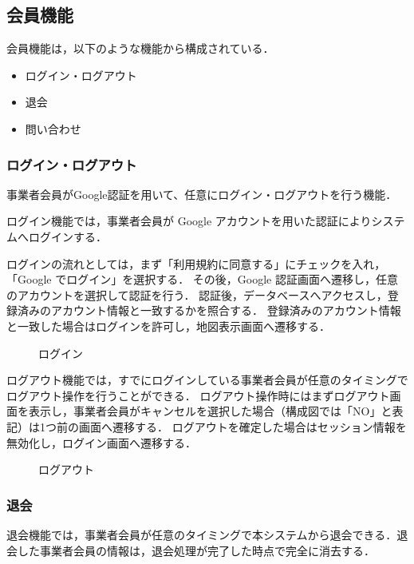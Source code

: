 \subsection{会員機能}
会員機能は，以下のような機能から構成されている．

\begin{itemize}
    \item ログイン・ログアウト
    \item 退会
    \item 問い合わせ
\end{itemize}


\subsubsection{ログイン・ログアウト}
事業者会員がGoogle認証を用いて、任意にログイン・ログアウトを行う機能．

ログイン機能では，事業者会員が Google アカウントを用いた認証によりシステムへログインする．

ログインの流れとしては，まず「利用規約に同意する」にチェックを入れ，「Google でログイン」を選択する．
その後，Google 認証画面へ遷移し，任意のアカウントを選択して認証を行う．
認証後，データベースへアクセスし，登録済みのアカウント情報と一致するかを照合する．
登録済みのアカウント情報と一致した場合はログインを許可し，地図表示画面へ遷移する．

\begin{figure}[H]
    \centering
    
    \caption{ログイン}
\end{figure}

ログアウト機能では，すでにログインしている事業者会員が任意のタイミングでログアウト操作を行うことができる．
ログアウト操作時にはまずログアウト画面を表示し，事業者会員がキャンセルを選択した場合（構成図では「NO」と表記）は1つ前の画面へ遷移する．
ログアウトを確定した場合はセッション情報を無効化し，ログイン画面へ遷移する．




\begin{figure}[H]
    \centering
    
    \caption{ログアウト}
\end{figure}

\subsubsection{退会}
退会機能では，事業者会員が任意のタイミングで本システムから退会できる．退会した事業者会員の情報は，退会処理が完了した時点で完全に消去する．

